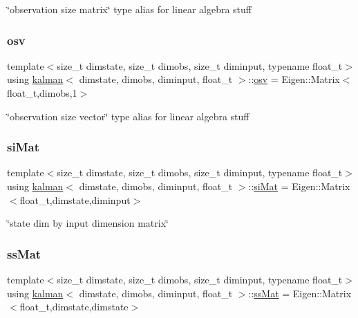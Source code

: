 \char`\"{}observation size matrix\char`\"{} type alias for linear algebra stuff \mbox{\label{classkalman_a0172e54797a5d5b0acc4168894adc6d5}} 
\subsubsection{\texorpdfstring{osv}{osv}}
{\footnotesize\ttfamily template$<$size\+\_\+t dimstate, size\+\_\+t dimobs, size\+\_\+t diminput, typename float\+\_\+t$>$ \\
using \hyperlink{classkalman}{kalman}$<$ dimstate, dimobs, diminput, float\+\_\+t $>$\+::\hyperlink{classcf__filter_a91d9961b2ecd202b1400c401434b392d}{osv} =  Eigen\+::\+Matrix$<$float\+\_\+t,dimobs,1$>$}

\char`\"{}observation size vector\char`\"{} type alias for linear algebra stuff \mbox{\label{classkalman_ab024c795f585385ee14aea92a5dccfbc}} 
\subsubsection{\texorpdfstring{si\+Mat}{siMat}}
{\footnotesize\ttfamily template$<$size\+\_\+t dimstate, size\+\_\+t dimobs, size\+\_\+t diminput, typename float\+\_\+t$>$ \\
using \hyperlink{classkalman}{kalman}$<$ dimstate, dimobs, diminput, float\+\_\+t $>$\+::\hyperlink{classkalman_ab024c795f585385ee14aea92a5dccfbc}{si\+Mat} =  Eigen\+::\+Matrix$<$float\+\_\+t,dimstate,diminput$>$}

\char`\"{}state dim by input dimension matrix\char`\"{} \mbox{\label{classkalman_a581550d9aba33245fb496b22a834831c}} 
\subsubsection{\texorpdfstring{ss\+Mat}{ssMat}}
{\footnotesize\ttfamily template$<$size\+\_\+t dimstate, size\+\_\+t dimobs, size\+\_\+t diminput, typename float\+\_\+t$>$ \\
using \hyperlink{classkalman}{kalman}$<$ dimstate, dimobs, diminput, float\+\_\+t $>$\+::\hyperlink{classkalman_a581550d9aba33245fb496b22a834831c}{ss\+Mat} =  Eigen\+::\+Matrix$<$float\+\_\+t,dimstate,dimstate$>$}


